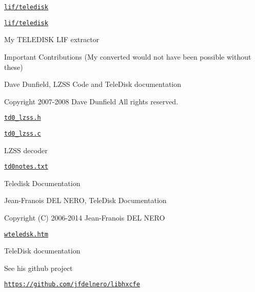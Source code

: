 \href{lif/teledisk}{\tt lif/teledisk}
\begin{DoxyItemize}
\item \href{lif/teledisk}{\tt lif/teledisk}
\begin{DoxyItemize}
\item My T\+E\+L\+E\+D\+I\+SK L\+IF extractor
\item Important Contributions (My converted would not have been possible without these)
\begin{DoxyItemize}
\item Dave Dunfield, L\+Z\+SS Code and Tele\+Disk documentation
\begin{DoxyItemize}
\item Copyright 2007-\/2008 Dave Dunfield All rights reserved.
\item \href{lif/teledisk/td0_lzss.h}{\tt td0\+\_\+lzss.\+h}
\item \href{lif/teledisk/td0_lzss.c}{\tt td0\+\_\+lzss.\+c}
\begin{DoxyItemize}
\item L\+Z\+SS decoder
\end{DoxyItemize}
\item \href{lif/teledisk/td0notes.txt}{\tt td0notes.\+txt}
\begin{DoxyItemize}
\item Teledisk Documentation
\end{DoxyItemize}
\end{DoxyItemize}
\item Jean-\/\+Franois D\+EL N\+E\+RO, Tele\+Disk Documentation
\begin{DoxyItemize}
\item Copyright (C) 2006-\/2014 Jean-\/\+Franois D\+EL N\+E\+RO
\begin{DoxyItemize}
\item \href{lif/teledisk/wteledsk.htm}{\tt wteledsk.\+htm}
\begin{DoxyItemize}
\item Tele\+Disk documentation
\end{DoxyItemize}
\item See his github project
\begin{DoxyItemize}
\item \href{https://github.com/jfdelnero/libhxcfe}{\tt https\+://github.\+com/jfdelnero/libhxcfe} 


\end{DoxyItemize}
\end{DoxyItemize}
\end{DoxyItemize}
\end{DoxyItemize}
\end{DoxyItemize}
\end{DoxyItemize}

